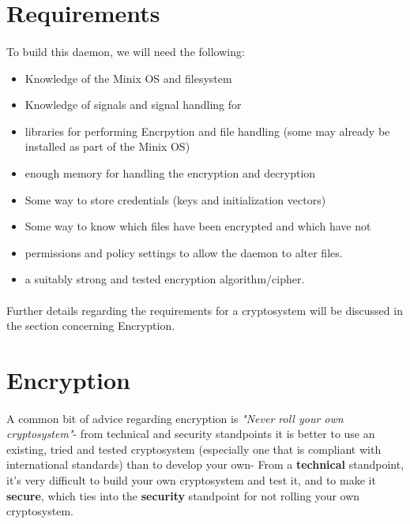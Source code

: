 \documentclass{article}
\begin{document}
\section{Requirements}
    \paragraph{}To build this daemon, we will need the following:
    \begin{itemize}
        \item Knowledge of the Minix OS and filesystem
        \item Knowledge of signals and signal handling for
        \item libraries for performing Encrpytion and file handling (some may already be installed as part of the Minix OS)
        \item enough memory for handling the encryption and decryption
        \item Some way to store credentials (keys and initialization vectors)
        \item Some way to know which files have been encrypted and which have not
        \item permissions and policy settings to allow the daemon to alter files.
        \item a suitably strong and tested encryption algorithm/cipher.
    \end{itemize}
    \paragraph{}Further details regarding the requirements for a cryptosystem will be discussed in the section concerning Encryption.

\section{Encryption}
    \paragraph{}A common bit of advice regarding encryption is \textit{"Never roll your own cryptosystem"}- from technical and security standpoints it is better to use an existing, tried and tested cryptosystem (especially one that is compliant with international standards) than to develop your own- From a \textbf{technical} standpoint, it's very difficult to build your own cryptosystem and test it, and to make it \textbf{secure}, which ties into the \textbf{security} standpoint for not rolling your own cryptosystem.
    
\end{document}
